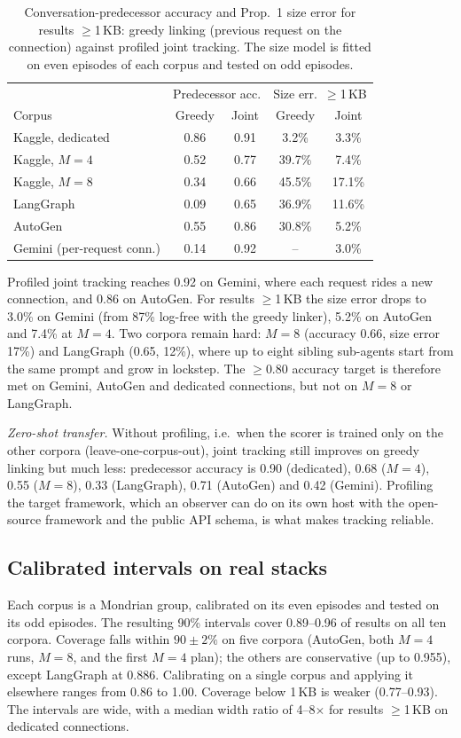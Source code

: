 \begin{table}[t]\centering
\caption{Conversation-predecessor accuracy and Prop.~1 size error for results $\geq$1\,KB: greedy linking (previous request on the connection) against profiled joint tracking. The size model is fitted on even episodes of each corpus and tested on odd episodes.}\label{tab:track}
\small\setlength{\tabcolsep}{4pt}
\begin{tabular}{lcccc}\toprule
 & \multicolumn{2}{c}{Predecessor acc.} & \multicolumn{2}{c}{Size err.\ $\geq$1\,KB}\\
Corpus & Greedy & Joint & Greedy & Joint\\\midrule
Kaggle, dedicated & 0.86 & 0.91 & 3.2\% & 3.3\% \\
Kaggle, $M{=}4$ & 0.52 & 0.77 & 39.7\% & 7.4\% \\
Kaggle, $M{=}8$ & 0.34 & 0.66 & 45.5\% & 17.1\% \\
LangGraph & 0.09 & 0.65 & 36.9\% & 11.6\% \\
AutoGen & 0.55 & 0.86 & 30.8\% & 5.2\% \\
Gemini (per-request conn.) & 0.14 & 0.92 & -- & 3.0\% \\
\bottomrule\end{tabular}\end{table}

Profiled joint tracking reaches 0.92 on Gemini, where each request rides a new connection, and 0.86 on AutoGen. For results $\geq$1\,KB the size error drops to 3.0\% on Gemini (from 87\% log-free with the greedy linker), 5.2\% on AutoGen and 7.4\% at $M{=}4$. Two corpora remain hard: $M{=}8$ (accuracy 0.66, size error 17\%) and LangGraph (0.65, 12\%), where up to eight sibling sub-agents start from the same prompt and grow in lockstep. The $\geq$0.80 accuracy target is therefore met on Gemini, AutoGen and dedicated connections, but not on $M{=}8$ or LangGraph.

\emph{Zero-shot transfer.} Without profiling, i.e.\ when the scorer is trained only on the other corpora (leave-one-corpus-out), joint tracking still improves on greedy linking but much less: predecessor accuracy is 0.90 (dedicated), 0.68 ($M{=}4$), 0.55 ($M{=}8$), 0.33 (LangGraph), 0.71 (AutoGen) and 0.42 (Gemini). Profiling the target framework, which an observer can do on its own host with the open-source framework and the public API schema, is what makes tracking reliable.

\subsection{Calibrated intervals on real stacks}\label{sec:cqrreal}
Each corpus is a Mondrian group, calibrated on its even episodes and tested on its odd episodes. The resulting 90\% intervals cover 0.89--0.96 of results on all ten corpora. Coverage falls within $90 \pm 2\%$ on five corpora (AutoGen, both $M{=}4$ runs, $M{=}8$, and the first $M{=}4$ plan); the others are conservative (up to 0.955), except LangGraph at 0.886. Calibrating on a single corpus and applying it elsewhere ranges from 0.86 to 1.00. Coverage below 1\,KB is weaker (0.77--0.93). The intervals are wide, with a median width ratio of 4--8$\times$ for results $\geq$1\,KB on dedicated connections.

